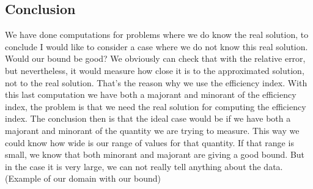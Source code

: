 \documentclass{article}
\begin{document}
	
	
	\subsection*{Conclusion}
	We have done computations for problems where we do know the real solution, to conclude I would like to consider a case where we do not know this real solution. Would our bound be good? We obviously can check that with the relative error, but nevertheless, it would measure how close it is to the approximated solution, not to the real solution. That's the reason why we use the efficiency index. With this last computation we have both a majorant and minorant of the efficiency index, the problem is that we need the real solution for computing the efficiency index. The conclusion then is that the ideal case would be if we have both a majorant and minorant of the quantity we are trying to measure. This way we could know how wide is our range of values for that quantity. If that range is small, we know that both minorant and majorant are giving a good bound. But in the case it is very large, we can not really tell anything about the data. (Example of our domain with our bound)
	
	
\end{document}
